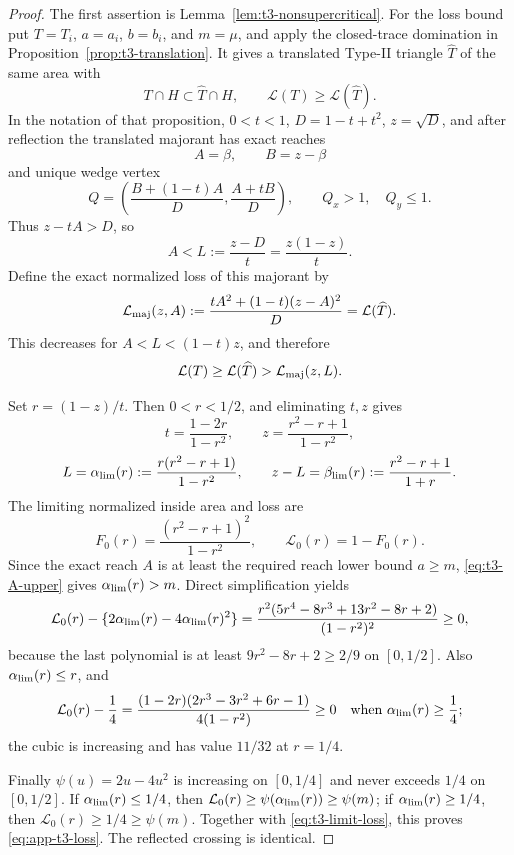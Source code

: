 \begin{proof}
The first assertion is Lemma~\ref{lem:t3-nonsupercritical}.  For the loss
bound put $T=T_i$, $a=a_i$, $b=b_i$, and $m=\mu$, and apply the
closed-trace domination in
Proposition~\ref{prop:t3-translation}.  It gives a translated Type-II
triangle $\widehat T$ of the same area with
\[
 T\cap H\subset\widehat T\cap H,
 \qquad \mathcal L(T)\ge \mathcal L(\widehat T).
\]
In the notation of that proposition, $0<t<1$,
$D=1-t+t^2$, $z=\sqrt D$, and after reflection the translated majorant has
exact reaches
\[
 A=\beta,\qquad B=z-\beta
\]
and unique wedge vertex
\[
 Q=\left(\frac{B+(1-t)A}{D},\frac{A+tB}{D}\right),
 \qquad Q_x>1,\quad Q_y\le1.
\]
Thus $z-tA>D$, so
\begin{equation}
 A<L:=\frac{z-D}{t}=\frac{z(1-z)}t.            \label{eq:t3-A-upper}
\end{equation}
Define the exact normalized loss of this majorant by
\[
 \mathcal L_{\rm maj}(z,A)
 :=\frac{tA^2+(1-t)(z-A)^2}{D}
 =\mathcal L(\widehat T).
\]
This decreases for $A<L<(1-t)z$, and therefore
\begin{equation}
 \mathcal L(T)\ge \mathcal L(\widehat T)>
 \mathcal L_{\rm maj}(z,L).                  \label{eq:t3-limit-loss}
\end{equation}

Set $r=(1-z)/t$.  Then $0<r<1/2$, and eliminating $t,z$ gives
\[
 t=\frac{1-2r}{1-r^2},\qquad
 z=\frac{r^2-r+1}{1-r^2},
\]
\[
 L=\alpha_{\rm lim}(r):=\frac{r(r^2-r+1)}{1-r^2},\qquad
 z-L=\beta_{\rm lim}(r):=\frac{r^2-r+1}{1+r}.
\]
The limiting normalized inside area and loss are
\[
 F_0(r)=\frac{(r^2-r+1)^2}{1-r^2},
 \qquad \mathcal L_0(r)=1-F_0(r).
\]
Since the exact reach $A$ is at least the required reach lower bound $a\ge m$,
\eqref{eq:t3-A-upper}
gives $\alpha_{\rm lim}(r)>m$.  Direct simplification yields
\[
 \mathcal L_0(r)-\{2\alpha_{\rm lim}(r)-4\alpha_{\rm lim}(r)^2\}
 =\frac{r^2(5r^4-8r^3+13r^2-8r+2)}{(1-r^2)^2}\ge0,
\]
because the last polynomial is at least $9r^2-8r+2\ge2/9$ on
$[0,1/2]$.  Also $\alpha_{\rm lim}(r)\le r$, and
\[
 \mathcal L_0(r)-\frac14
 =\frac{(1-2r)(2r^3-3r^2+6r-1)}{4(1-r^2)}\ge0
 \quad\text{when }\alpha_{\rm lim}(r)\ge\frac14;
\]
the cubic is increasing and has value $11/32$ at $r=1/4$.

Finally $\psi(u)=2u-4u^2$ is increasing on $[0,1/4]$ and never exceeds
$1/4$ on $[0,1/2]$.  If $\alpha_{\rm lim}(r)\le1/4$, then
$\mathcal L_0(r)\ge\psi(\alpha_{\rm lim}(r))\ge\psi(m)$; if $\alpha_{\rm lim}(r)\ge1/4$, then
$\mathcal L_0(r)\ge1/4\ge\psi(m)$.  Together with \eqref{eq:t3-limit-loss}, this proves
\eqref{eq:app-t3-loss}.  The reflected crossing is identical.
\end{proof}

